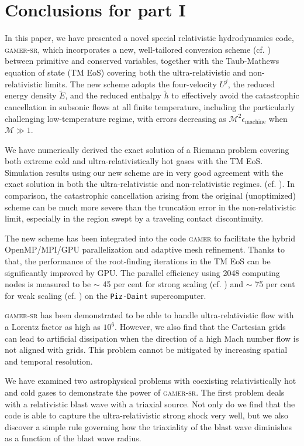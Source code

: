 \chapter{Conclusions for part I}
\label{c:conclusions-1}
 In this paper, we have presented a novel special relativistic hydrodynamics code, \textsc{gamer-sr}, which incorporates a new, well-tailored conversion scheme (cf. ) between primitive and conserved variables, together with the Taub-Mathews equation of state (TM EoS) covering both the ultra-relativistic and non-relativistic limits. The new scheme adopts the four-velocity $U^{j}$, the reduced energy density $\tilde{E}$, and the reduced enthalpy $\tilde{h}$ to effectively avoid the catastrophic cancellation in subsonic flows at all finite temperature, including the particularly challenging low-temperature regime, with errors decreasing as $\mathscr{M}^2\epsilon_{\text{machine}}$ when $\mathscr{M}\gg1$.

 We have numerically derived the exact solution of a Riemann problem covering both extreme cold and ultra-relativistically hot gases with the TM EoS. Simulation results using our new scheme are in very good agreement with the exact solution in both the ultra-relativistic and non-relativistic regimes. (cf. ). In comparison, the catastrophic cancellation arising from the original (unoptimized) scheme can be much more severe than the truncation error in the non-relativistic limit, especially in the region swept by a traveling contact discontinuity.

The new scheme has been integrated into the code \textsc{gamer} to facilitate the hybrid OpenMP/MPI/GPU parallelization and adaptive mesh refinement. Thanks to that, the performance of the root-finding iterations in the TM EoS can be significantly improved by GPU. The parallel efficiency using 2048 computing nodes is measured to be $\sim$ 45 per cent for strong scaling (cf. ) and $\sim$ 75 per cent for weak scaling (cf. ) on the \texttt{Piz-Daint} supercomputer.

\textsc{gamer-sr} has been demonstrated to be able to handle ultra-relativistic flow with a Lorentz factor as high as $10^6$. However, we also find that the Cartesian grids can lead to artificial dissipation when the direction of a high Mach number flow is not aligned with grids. This problem cannot be mitigated by increasing spatial and temporal resolution.

 We have examined two astrophysical problems with coexisting relativistically hot and cold gases to demonstrate the power of \textsc{gamer-sr}. The first problem deals with a relativistic blast wave with a triaxial source. Not only do we find that the code is able to capture the ultra-relativistic strong shock very well, but we also discover a simple rule governing how the triaxiality of the blast wave diminishes as a function of the blast wave radius.

